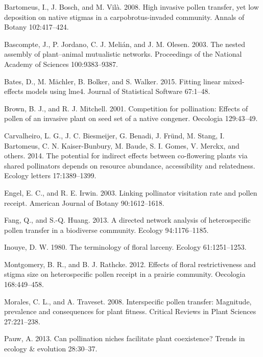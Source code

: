 \documentclass[11pt,a4paper]{article}
\begin{document}
\hypertarget{ref-bartomeus2008}{}
Bartomeus, I., J. Bosch, and M. Vilà. 2008. High invasive pollen
transfer, yet low deposition on native stigmas in a carpobrotus-invaded
community. Annals of Botany 102:417--424.

\hypertarget{ref-bascompte2003}{}
Bascompte, J., P. Jordano, C. J. Melián, and J. M. Olesen. 2003. The
nested assembly of plant--animal mutualistic networks. Proceedings of
the National Academy of Sciences 100:9383--9387.

\hypertarget{ref-Bates_2015}{}
Bates, D., M. Mächler, B. Bolker, and S. Walker. 2015. Fitting linear
mixed-effects models using lme4. Journal of Statistical Software
67:1--48.

\hypertarget{ref-brown2001}{}
Brown, B. J., and R. J. Mitchell. 2001. Competition for pollination:
Effects of pollen of an invasive plant on seed set of a native congener.
Oecologia 129:43--49.

\hypertarget{ref-carvalheiro2014}{}
Carvalheiro, L. G., J. C. Biesmeijer, G. Benadi, J. Fründ, M. Stang, I.
Bartomeus, C. N. Kaiser-Bunbury, M. Baude, S. I. Gomes, V. Merckx, and
others. 2014. The potential for indirect effects between co-flowering
plants via shared pollinators depends on resource abundance,
accessibility and relatedness. Ecology letters 17:1389--1399.

\hypertarget{ref-engel2003}{}
Engel, E. C., and R. E. Irwin. 2003. Linking pollinator visitation rate
and pollen receipt. American Journal of Botany 90:1612--1618.

\hypertarget{ref-fang2013}{}
Fang, Q., and S.-Q. Huang. 2013. A directed network analysis of
heterospecific pollen transfer in a biodiverse community. Ecology
94:1176--1185.

\hypertarget{ref-inouye1980}{}
Inouye, D. W. 1980. The terminology of floral larceny. Ecology
61:1251--1253.

\hypertarget{ref-montgomery2012}{}
Montgomery, B. R., and B. J. Rathcke. 2012. Effects of floral
restrictiveness and stigma size on heterospecific pollen receipt in a
prairie community. Oecologia 168:449--458.

\hypertarget{ref-morales2008}{}
Morales, C. L., and A. Traveset. 2008. Interspecific pollen transfer:
Magnitude, prevalence and consequences for plant fitness. Critical
Reviews in Plant Sciences 27:221--238.

\hypertarget{ref-pauw2013}{}
Pauw, A. 2013. Can pollination niches facilitate plant coexistence?
Trends in ecology \& evolution 28:30--37.
\end{document}
